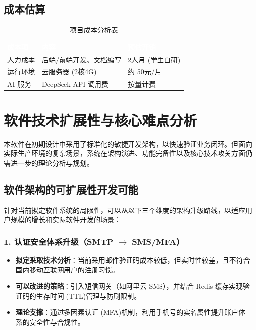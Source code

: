 \documentclass[12pt,a4paper]{article}
\begin{document}
\subsection{成本估算}
\begin{table}[H]
\centering
\begin{tabular}{|l|l|l|}
\hline
\rowcolor{headerblue} \textcolor{white}{\textbf{成本项}} & \textcolor{white}{\textbf{内容}} & \textcolor{white}{\textbf{预估开销}} \\
\hline
人力成本 & 后端/前端开发、文档编写 & 2人月 (学生自研) \\
\hline
运行环境 & 云服务器 (2核4G) & 约 50元/月 \\
\hline
AI 服务 & DeepSeek API 调用费 & 按量计费 \\
\hline
\end{tabular}
\caption{项目成本分析表}
\end{table}

\section{软件技术扩展性与核心难点分析}

本软件在初期设计中采用了标准化的敏捷开发架构，以快速验证业务闭环。但面向实际生产环境的复杂场景，系统在架构演进、功能完备性以及核心技术攻关方面仍需进一步的理论分析与规划。

\subsection{软件架构的可扩展性开发可能}
针对当前拟定软件系统的局限性，可以从以下三个维度的架构升级路线，以适应用户规模的增长和实际软件开发的场景：

\subsubsection{1. 认证安全体系升级（SMTP $\rightarrow$ SMS/MFA）}
\begin{itemize}
    \item \textbf{拟定采取技术分析}：当前采用邮件验证码成本较低，但实时性较差，且不符合国内移动互联网用户的注册习惯。
    \item \textbf{可以改进的策略}：引入短信网关（如阿里云 SMS），并结合 Redis 缓存实现验证码的生存时间 (TTL)管理与防刷限制。
    \item \textbf{理论支撑}：通过多因素认证 (MFA)机制，利用手机号的实名属性提升账户体系的安全性与合规性。
\end{itemize}
\end{document}

